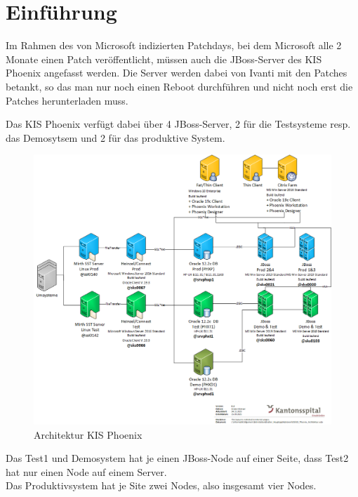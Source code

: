 
\chapter{Einführung}
\begin{flushleft}
    Im Rahmen des von Microsoft indizierten Patchdays, bei dem Microsoft alle 2 Monate einen Patch veröffentlicht, müssen auch die \Gls{JBoss}-Server des KIS Phoenix angefasst werden.
    Die Server werden dabei von \Gls{Ivanti} mit den Patches betankt, so das man nur noch einen Reboot durchführen und nicht noch erst die Patches herunterladen muss.
\end{flushleft}
\begin{flushleft}
    Das KIS Phoenix verfügt dabei über 4 JBoss-Server, 2 für die Testsysteme resp.
    das Demosytsem und 2 für das produktive System.
    \begin{figure}[H]
        \centering
        \includegraphics[width=1\linewidth]{source/introduction/KIS_Phoenix_Architektur}
        \caption{Architektur KIS Phoenix\cite{KFDFYH5H}}
        \label{fig:architektur-kis-phoenix}
    \end{figure}
\end{flushleft}
\begin{flushleft}
    Das Test1 und Demosystem hat je einen JBoss-Node auf einer Seite, dass Test2 hat nur einen Node auf einem Server.\\
    Das Produktivsystem hat je Site zwei Nodes, also insgesamt vier Nodes.
\end{flushleft}
